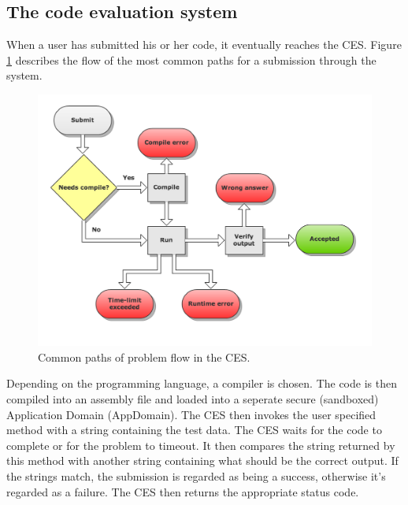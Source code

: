 \subsection{The code evaluation system}
When a user has submitted his or her code, it eventually reaches the CES. Figure \ref{fig:flowchart} describes the flow of the most common paths for a submission through the system.

\begin{figure}[h]
	\centering
	\includegraphics[width=0.8\linewidth]{chapters/media/flowchart.png}
	\caption{Common paths of problem flow in the CES.}
	\label{fig:flowchart}
\end{figure}

Depending on the programming language, a compiler is chosen. The code is then compiled into an assembly file and loaded into a seperate secure (sandboxed) Application Domain (AppDomain). The CES then invokes the user specified method with a string containing the test data. The CES waits for the code to complete or for the problem to timeout. It then compares the string returned by this method with another string containing what should be the correct output. If the strings match, the submission is regarded as being a success, otherwise it's regarded as a failure. The CES then returns the appropriate status code. 


